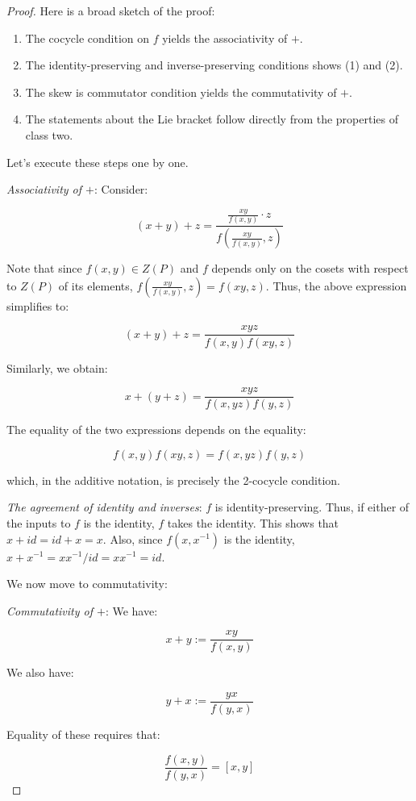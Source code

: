 \documentclass[10pt]{amsart}
\begin{document}
\begin{proof}
  Here is a broad sketch of the proof:
  \begin{enumerate}
  \item The cocycle condition on $f$ yields the associativity of $+$.
  \item The identity-preserving and inverse-preserving conditions
  shows (1) and (2).
  \item The skew is commutator condition yields the commutativity of
    $+$.
  \item The statements about the Lie bracket follow directly from the
    properties of class two.
  \end{enumerate}

  Let's execute these steps one by one.

  {\em Associativity of $+$}: Consider:

  $$(x + y) + z = \frac{\frac{xy}{f(x,y)} \cdot z}{f\left(\frac{xy}{f(x,y)},z\right)}$$

  Note that since $f(x,y) \in Z(P)$ and $f$ depends only on the cosets
  with respect to $Z(P)$ of its elements, $f(\frac{xy}{f(x,y)},z) =
  f(xy,z)$. Thus, the above expression simplifies to:

  $$(x + y) + z = \frac{xyz}{f(x,y)f(xy,z)}$$

  Similarly, we obtain:

  $$x + (y + z) = \frac{xyz}{f(x,yz)f(y,z)}$$

  The equality of the two expressions depends on the equality:

  $$f(x,y)f(xy,z) = f(x,yz)f(y,z)$$

  which, in the additive notation, is precisely the 2-cocycle
  condition.

  {\em The agreement of identity and inverses}: $f$ is
  identity-preserving. Thus, if either of the inputs to $f$ is the
  identity, $f$ takes the identity. This shows that $x + id = id + x =
  x$. Also, since $f(x,x^{-1})$ is the identity, $x + x^{-1} =
  xx^{-1}/id = xx^{-1} = id$.

  We now move to commutativity:

  {\em Commutativity of $+$}: We have:

  $$x + y := \frac{xy}{f(x,y)}$$

  We also have:

  $$y + x := \frac{yx}{f(y,x)}$$

  Equality of these requires that:

  $$\frac{f(x,y)}{f(y,x)} = [x,y]$$


\end{proof}
\end{document}
